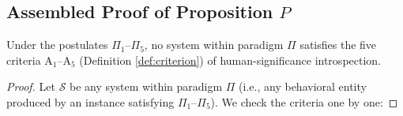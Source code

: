\subsection{Assembled Proof of Proposition \texorpdfstring{$P$}{P}}

\begin{proposition}[$P$]
Under the postulates $\Pi_1$--$\Pi_5$, no system within paradigm $\Pi$ satisfies the five
criteria $\mathrm{A}_1$--$\mathrm{A}_5$ (Definition \ref{def:criterion}) of
human-significance introspection.
\end{proposition}

\begin{proof}
Let $\mathcal{S}$ be any system within paradigm $\Pi$ (i.e., any behavioral entity produced
by an instance satisfying $\Pi_1$--$\Pi_5$). We check the criteria one by one:


\end{proof}
